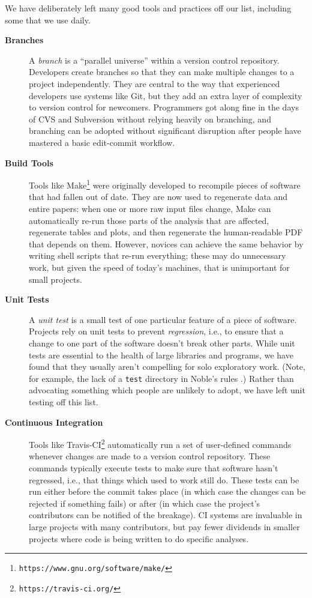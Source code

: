 \documentclass[10pt]{article}
\newcommand{\withurl}[2]{{#1}\footnote{\texttt{#2}}}
\begin{document}
We have deliberately left many good tools and practices off our list,
including some that we use daily.

\begin{description}

\item[\textbf{Branches}]
A \emph{branch} is a ``parallel universe'' within a version control
repository. Developers create branches so that they can make multiple
changes to a project independently. They are central to the way that
experienced developers use systems like Git, but they add an extra layer
of complexity to version control for newcomers. Programmers got along
fine in the days of CVS and Subversion without relying heavily on
branching, and branching can be adopted without significant disruption
after people have mastered a basic edit-commit workflow.

\item[\textbf{Build Tools}] Tools like
  \withurl{Make}{https://www.gnu.org/software/make/} were originally
  developed to recompile pieces of software that had fallen out of
  date. They are now used to regenerate data and entire papers: when
  one or more raw input files change, Make can automatically re-run
  those parts of the analysis that are affected, regenerate tables and
  plots, and then regenerate the human-readable PDF that depends on
  them.  However, novices can achieve the same behavior by writing
  shell scripts that re-run everything; these may do unnecessary work,
  but given the speed of today's machines, that is unimportant for
  small projects.

\item[\textbf{Unit Tests}] A \emph{unit test} is a small test of one
  particular feature of a piece of software. Projects rely on unit
  tests to prevent \emph{regression}, i.e., to ensure that a change to
  one part of the software doesn't break other parts. While unit tests
  are essential to the health of large libraries and programs, we have
  found that they usually aren't compelling for solo exploratory
  work. (Note, for example, the lack of a \texttt{test} directory in
  Noble's rules \cite{noble2009}.)  Rather than advocating something
  which people are unlikely to adopt, we have left unit testing off
  this list.

\item[\textbf{Continuous Integration}] Tools like
  \withurl{Travis-CI}{https://travis-ci.org/} automatically run a set of
  user-defined commands whenever changes are made to a version control
  repository. These commands typically execute tests to make sure that
  software hasn't regressed, i.e., that things which used to work
  still do. These tests can be run either before the commit takes
  place (in which case the changes can be rejected if something fails)
  or after (in which case the project's contributors can be notified
  of the breakage). CI systems are invaluable in large projects with
  many contributors, but pay fewer dividends in smaller projects where
  code is being written to do specific analyses.


\end{description}
\end{document}
